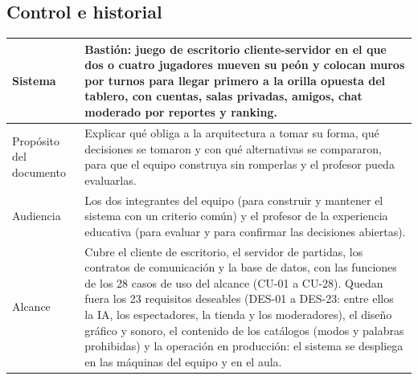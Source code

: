 \documentclass[11pt,letterpaper]{article}
\begin{document}
\subsection{Control e historial}
\noindent\begin{tabularx}{\linewidth}{|L|Y|}\hline
  Sistema & Bastión: juego de escritorio cliente-servidor en el que dos o cuatro jugadores mueven su peón y colocan muros por turnos para llegar primero a la orilla opuesta del tablero, con cuentas, salas privadas, amigos, chat moderado por reportes y ranking.\\\hline
  Propósito del documento & Explicar qué obliga a la arquitectura a tomar su forma, qué decisiones se tomaron y con qué alternativas se compararon, para que el equipo construya sin romperlas y el profesor pueda evaluarlas.\\\hline
  Audiencia & Los dos integrantes del equipo (para construir y mantener el sistema con un criterio común) y el profesor de la experiencia educativa (para evaluar y para confirmar las decisiones abiertas).\\\hline
  Alcance & Cubre el cliente de escritorio, el servidor de partidas, los contratos de comunicación y la base de datos, con las funciones de los 28 casos de uso del alcance (CU-01 a CU-28). Quedan fuera los 23 requisitos deseables (DES-01 a DES-23: entre ellos la IA, los espectadores, la tienda y los moderadores), el diseño gráfico y sonoro, el contenido de los catálogos (modos y palabras prohibidas) y la operación en producción: el sistema se despliega en las máquinas del equipo y en el aula.\\\hline
\end{tabularx}
\end{document}
